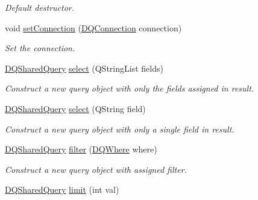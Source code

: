 \begin{DoxyCompactItemize}
\begin{DoxyCompactList}\small\item\em Default destructor. \item\end{DoxyCompactList}\item 
\hypertarget{classDQSharedQuery_a3f59e7684a41586b3bd1b06fc847b024}{
void \hyperlink{classDQSharedQuery_a3f59e7684a41586b3bd1b06fc847b024}{setConnection} (\hyperlink{classDQConnection}{DQConnection} connection)}
\label{classDQSharedQuery_a3f59e7684a41586b3bd1b06fc847b024}

\begin{DoxyCompactList}\small\item\em Set the connection. \item\end{DoxyCompactList}\item 
\hyperlink{classDQSharedQuery}{DQSharedQuery} \hyperlink{classDQSharedQuery_a60a2efb0904f71a2b65adc780fe86079}{select} (QStringList fields)
\begin{DoxyCompactList}\small\item\em Construct a new query object with only the fields assigned in result. \item\end{DoxyCompactList}\item 
\hyperlink{classDQSharedQuery}{DQSharedQuery} \hyperlink{classDQSharedQuery_a358915a000eb6fe7e1e7f1d32c0f34b8}{select} (QString field)
\begin{DoxyCompactList}\small\item\em Construct a new query object with only a single field in result. \item\end{DoxyCompactList}\item 
\hypertarget{classDQSharedQuery_ac2cfe9a2d996d9b5cf6ce4c8726dc233}{
\hyperlink{classDQSharedQuery}{DQSharedQuery} \hyperlink{classDQSharedQuery_ac2cfe9a2d996d9b5cf6ce4c8726dc233}{filter} (\hyperlink{classDQWhere}{DQWhere} where)}
\label{classDQSharedQuery_ac2cfe9a2d996d9b5cf6ce4c8726dc233}

\begin{DoxyCompactList}\small\item\em Construct a new query object with assigned filter. \item\end{DoxyCompactList}\item 
\hypertarget{classDQSharedQuery_af1692cc5a046c2061486277f15545af1}{
\hyperlink{classDQSharedQuery}{DQSharedQuery} \hyperlink{classDQSharedQuery_af1692cc5a046c2061486277f15545af1}{limit} (int val)}
\label{classDQSharedQuery_af1692cc5a046c2061486277f15545af1}


\end{DoxyCompactItemize}

